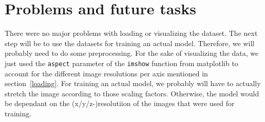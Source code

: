 \documentclass{article}
\begin{document}
	\section{Problems and future tasks}

		There were no major problems with loading or visualizing the dataset. The next step will be to use the datasets for training an actual model. Therefore, we will probably need to do some preprocessing. For the sake of visualizing the data, we just used the \lstinline{aspect} parameter of the \lstinline{imshow} function from matplotlib to account for the different image resolutions per axis mentioned in section~\ref{loading}. For training an actual model, we probably will have to actually stretch the image according to those scaling factors. Otherwise, the model would be dependant on the (x/y/z-)resolutiion of the images that were used for training.
\end{document}
